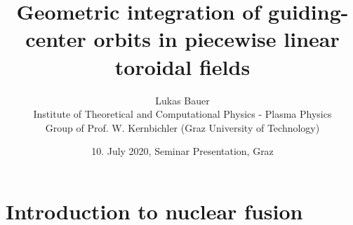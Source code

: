\documentclass{beamer}
\title[]
{Geometric integration of guiding-center orbits in piecewise linear toroidal fields}
\author[L.~Bauer]{\scriptsize Lukas Bauer\\
	Institute of Theoretical and Computational Physics - Plasma Physics\\Group of Prof. W. Kernbichler (Graz University of Technology)
}
\date{10. July 2020, Seminar Presentation, Graz} %
\institute[Institute of Theoretical and Computational Physics]
{
}
\begin{document}
\titleframe






\section{Introduction to nuclear fusion}
\end{document}
